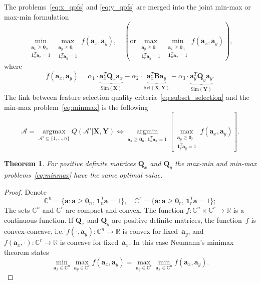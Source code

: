 \documentclass[12pt,twoside]{article}
\newtheorem{theorem}{Theorem}
\newcommand{\ba}{\mathbf{a}}
\newcommand{\bY}{\mathbf{Y}}
\newcommand{\bX}{\mathbf{X}}
\newcommand{\bB}{\mathbf{B}}
\newcommand{\bQ}{\mathbf{Q}}
\newcommand{\bbR}{\mathbb{R}}
\newcommand{\cA}{\mathcal{A}}
\newcommand{\bOne}{\boldsymbol{1}}
\newcommand{\bZero}{\boldsymbol{0}}
\newcommand{\argmin}{\mathop{\arg \min}\limits}
\newcommand{\argmax}{\mathop{\arg \max}\limits}
\begin{document}
The problems~\eqref{eq:x_qpfs} and \eqref{eq:y_qpfs} are merged into the joint min-max or max-min formulation
\begin{equation}
	\min_{\substack{\ba_x \geq \bZero_n \\ \bOne_n^T\ba_x=1}} 	\max_{\substack{\ba_y \geq \bZero_r \\ \bOne_r^T\ba_y=1}} f(\ba_x, \ba_y), \quad \left(\text {or} \, \max_{\substack{\ba_y \geq \bZero_r \\ \bOne_r^T\ba_y=1}} \min_{\substack{\ba_x \geq \bZero_n \\ \bOne_n^T\ba_x=1}} f(\ba_x, \ba_y)\right),
	\label{eq:minmax}
\end{equation}
where
\[
	f(\ba_x, \ba_y) = \alpha_1 \cdot \underbrace{\ba_x^T \bQ_x \ba_x}_{\text{Sim}(\bX)} - \alpha_2 \cdot \underbrace{\ba_x^T \bB \ba_y}_{\text{Rel}(\bX, \bY)} - \alpha_3 \cdot \underbrace{\ba_y^T \bQ_y \ba_y}_{\text{Sim}(\bY)}.
\]
The link between feature selection quality criteria~\eqref{eq:subset_selection} and the min-max problem~\eqref{eq:minmax} is the following
\begin{equation}
\cA = \argmax_{\cA' \subseteq \{1, \dots, n\}} Q(\cA' | \bX, \bY) \Leftrightarrow \argmin_{\ba_x \geq \bZero_n, \, \bOne_n^T\ba_x=1} \left[\max_{\substack{\ba_y \geq \bZero_r \\ \bOne_r^T\ba_y=1}} f(\ba_x, \ba_y)\right].
\end{equation}
\begin{theorem}
	For positive definite matrices $\bQ_x$ and $\bQ_y$ the max-min and min-max problems~\eqref{eq:minmax} have the same optimal value.
\end{theorem}
\begin{proof}
	Denote
	\begin{equation*}
	\mathbb{C}^n = \{\ba : \ba \geq \bZero_n, \, \bOne_n^T\ba=1\}, \quad \mathbb{C}^r = \{\ba : \ba \geq \bZero_r, \, \bOne_r^T\ba=1\};
	\end{equation*}
	The sets $\mathbb{C}^n$ and $\mathbb{C}^r$ are compact and convex. The function $f: \mathbb{C}^n \times \mathbb{C}^r \rightarrow \bbR$ is a continuous function. If $\bQ_x$ and $\bQ_y$ are positive definite matrices, the function~$f$ is convex-concave, i.e.
	$f(\cdot, \ba_y): \mathbb{C}^n \rightarrow \bbR$ is convex for fixed~$\ba_y$, and $f(\ba_x, \cdot): \mathbb{C}^r \rightarrow \bbR$ is concave for fixed~$\ba_x$.
	In this case Neumann's minimax theorem states
	\[
	\min_{\ba_x \in \mathbb{C}^n} \max_{\ba_y \in \mathbb{C}^r} f(\ba_x, \ba_y) = \max_{\ba_y \in \mathbb{C}^r} \min_{\ba_x\in \mathbb{C}^n} f(\ba_x, \ba_y).
	\]
\end{proof}
\end{document}
